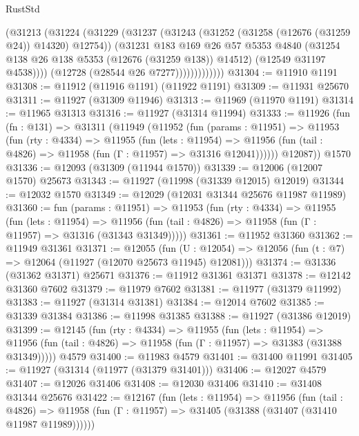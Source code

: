 \begin{lexlean}{RustStd}
\begin{coremodule}
                      (@31213
                        (@31224
                          (@31229
                            (@31237
                              (@31243 (@31252 (@31258 (@12676 (@31259 @24)) @14320) @12754))
                              (@31231
                                @183
                                @169
                                @26
                                @57
                                @5353
                                @4840
                                (@31254 @138 @26 @138 @5353 (@12676 (@31259 @138)) @14512)
                                (@12549 @31197 @4538))))
                          (@12728 (@28544 @26 @7277)))))))))))))
@31304 := @11910 @1191
@31308 := @11912 (@11916 @1191) (@11922 @1191)
@31309 := @11931 @25670
@31311 := @11927 (@31309 @11946)
@31313 := @11969 (@11970 @1191)
@31314 := @11965 @31313
@31316 := @11927 (@31314 @11994)
@31333 := @11926
    (fun (fn : @131) =>
    @31311
      (@11949
        (@11952
          (fun (params : @11951) =>
          @11953
            (fun (rty : @4334) =>
            @11955
              (fun (lets : @11954) =>
              @11956 (fun (tail : @4826) => @11958 (fun (Γ : @11957) => @31316 @12041))))))
        @12087))
    @1570
@31336 := @12093 (@31309 (@11944 @1570))
@31339 := @12006 (@12007 @1570) @25673
@31343 := @11927 (@11998 (@31339 @12015) @12019)
@31344 := @12032 @1570
@31349 := @12029 (@12031 @31344 @25676 @11987 @11989)
@31360 := fun (params : @11951) =>
  @11953
    (fun (rty : @4334) =>
    @11955
      (fun (lets : @11954) =>
      @11956 (fun (tail : @4826) => @11958 (fun (Γ : @11957) => @31316 (@31343 @31349)))))
@31361 := @11952 @31360
@31362 := @11949 @31361
@31371 := @12055
    (fun (U : @12054) => @12056 (fun (t : @7) => @12064 (@11927 (@12070 @25673 @11945) @12081)))
@31374 := @31336 (@31362 @31371) @25671
@31376 := @11912 @31361 @31371
@31378 := @12142 @31360 @7602
@31379 := @11979 @7602
@31381 := @11977 (@31379 @11992)
@31383 := @11927 (@31314 @31381)
@31384 := @12014 @7602
@31385 := @31339 @31384
@31386 := @11998 @31385
@31388 := @11927 (@31386 @12019)
@31399 := @12145
    (fun (rty : @4334) =>
    @11955
      (fun (lets : @11954) =>
      @11956 (fun (tail : @4826) => @11958 (fun (Γ : @11957) => @31383 (@31388 @31349)))))
    @4579
@31400 := @11983 @4579
@31401 := @31400 @11991
@31405 := @11927 (@31314 (@11977 (@31379 @31401)))
@31406 := @12027 @4579
@31407 := @12026 @31406
@31408 := @12030 @31406
@31410 := @31408 @31344 @25676
@31422 := @12167
    (fun (lets : @11954) =>
    @11956
      (fun (tail : @4826) =>
      @11958 (fun (Γ : @11957) => @31405 (@31388 (@31407 (@31410 @11987 @11989))))))

\end{coremodule}
\end{lexlean}
